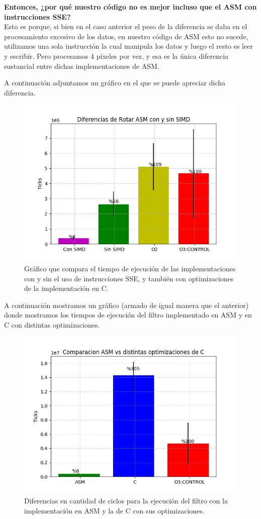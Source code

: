 {\medskip
\textbf{Entonces, ¿por qué nuestro código no es mejor incluso que el ASM con instrucciones SSE?} \\
Esto es porque, si bien en el caso anterior el peso de la diferencia se daba en el procesamiento excesivo de los datos, en nuestro código de ASM esto no sucede, utilizamos una sola instrucción la cual manipula los datos y luego el resto es leer y escribir. Pero procesamos 4 píxeles por vez, y esa es la única diferencia sustancial entre dichas implementaciones de ASM.
}
\newpage
\par{A continuación adjuntamos un gráfico en el que se puede apreciar dicha diferencia.}
	
\begin{figure}[H]
\centering
\captionsetup{justification=centering}
	\includegraphics[width = 15 cm, height = 10 cm]{imagenes/RotarSinSIMD.png}
\caption[center]{Gráfico que compara el tiempo de ejecución de las implementaciones con y sin el uso de instrucciones SSE, y también con optimizaciones de la implementación en C.}
\end{figure}

\par{A continuación mostramos un gráfico (armado de igual manera que el anterior) donde mostramos los tiempos de ejecución del filtro implementado en ASM y en C con distintas optimizaciones.}
	
\begin{figure}[H]
\centering
\captionsetup{justification=centering}
\includegraphics[width = 12 cm, height = 7 cm]{imagenes/ASMvsCRotar.png}
\caption[center]{Diferencias en cantidad de ciclos para la ejecución del filtro con la implementación en ASM y la de C con sus optimizaciones.}
\end{figure}